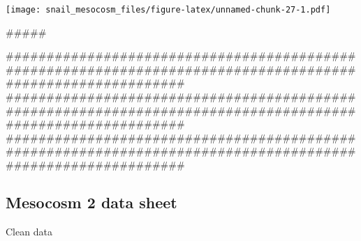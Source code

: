 \documentclass[10,portrait]{article}
\newenvironment{Shaded}{\begin{snugshade}}{\end{snugshade}}
\newcommand{\NormalTok}[1]{#1}
\let\oldsubparagraph\subparagraph
\renewcommand{\subparagraph}[1]{\oldsubparagraph{#1}\mbox{}}
\begin{document}
\texttt{[image: snail\_mesocosm\_files/figure-latex/unnamed-chunk-27-1.pdf]}

\begin{Shaded}
\begin{Highlighting}[]
\NormalTok{#####}

\NormalTok{############################################################################################################}
\NormalTok{############################################################################################################}
\NormalTok{############################################################################################################}
\end{Highlighting}
\end{Shaded}

\subparagraph{}\label{section-1}

\subsection{Mesocosm 2 data sheet}\label{mesocosm-2-data-sheet}

Clean data
\end{document}
